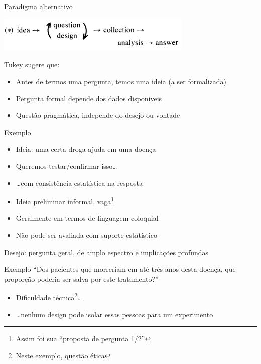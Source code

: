 \documentclass{beamer}
\begin{document}
\begin{frame}{Paradigma alternativo}
  \begin{center}
    \includegraphics[width=0.7\textwidth]{EDA/eda-tukey2}
  \end{center}
  \scriptsize
  Tukey sugere que:
  \bigskip
  \begin{itemize}
    \footnotesize
  \item Antes de termos uma pergunta, temos uma ideia (a ser
    formalizada)
    \bigskip
  \item Pergunta formal depende dos dados disponíveis
    \bigskip
  \item Questão pragmática, independe do desejo ou vontade
  \end{itemize}
\end{frame}

\begin{frame}
  \begin{exampleblock}{Exemplo}
    \begin{itemize}
      \scriptsize
    \item<1-> Ideia: uma certa droga ajuda em uma doença
    \item<2-> Queremos testar/confirmar isso\ldots
    \item<3-> \ldots com consistência estatística na resposta
    \end{itemize}
  \end{exampleblock}
  \bigskip
  \begin{itemize}
  \item<1-> Ideia preliminar informal, vaga\footnote{Assim foi sua ``proposta de pergunta 1/2''}
    \bigskip
  \item<1-> Geralmente em termos de linguagem coloquial
    \bigskip
  \item<3-> Não pode ser avaliada com suporte estatístico
  \end{itemize}
\end{frame}

\begin{frame}
  \scriptsize
  Desejo: pergunta geral, de amplo espectro e implicações profundas
  \bigskip
  \begin{exampleblock}{Exemplo}
    \scriptsize
    ``Dos pacientes que morreriam em até três anos desta doença, que
    proporção poderia ser salva por este tratamento?''
  \end{exampleblock}
  \bigskip
  \begin{itemize}
    \footnotesize
  \item Dificuldade técnica\footnote{Neste exemplo, questão ética}\ldots
    \bigskip
  \item \ldots nenhum design pode isolar essas pessoas para um experimento
  \end{itemize}
\end{frame}
\end{document}
